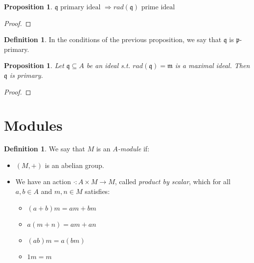 \documentclass[11pt]{article}
\newtheorem{prop}[theorem]{Proposition}
\theoremstyle{definition}
\newtheorem{defn}[theorem]{Definition}
\begin{document}
        \begin{prop}
            $\mathfrak{q} \text{ primary ideal } \Longrightarrow rad(\mathfrak{q}) \text{ prime ideal }$
        \end{prop}
            \begin{proof}


            \end{proof}

        \begin{defn}
            In the conditions of the previous proposition, we say that $\mathfrak{q}$ is $\mathfrak{p}$-primary.
        \end{defn}

        \begin{prop}
            Let $\mathfrak{q} \subseteq A$ be an ideal s.t. $rad(\mathfrak{q}) = \mathfrak{m}$ is a maximal ideal.
            Then $\mathfrak{q}$ is primary.
        \end{prop}
            \begin{proof}


            \end{proof}

    \section{Modules}\label{sec:modules}

        \begin{defn}
            We say that $M$ is an \emph{$A$-module} if:
            \begin{itemize}
                \item $(M, +)$ is an abelian group.
                \item We have an action $\cdot: A \times M \longrightarrow M$, called \emph{product by scalar}, which for all $a, b \in A$ and $m, n \in M$ satisfies:
                \begin{itemize}
                    \item $(a + b)m = am + bm$
                    \item $a(m + n) = am + an$
                    \item $(ab)m = a (bm)$
                    \item $1 m = m$
                \end{itemize}
            \end{itemize}
        \end{defn}
\end{document}
